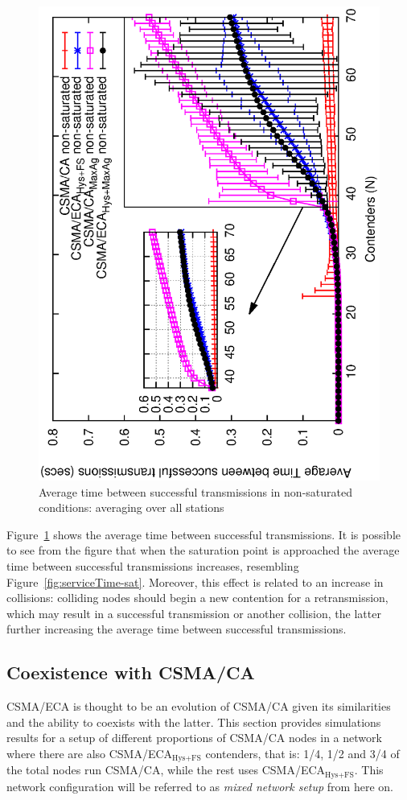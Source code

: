 	\begin{figure}[tb]
		\centering
		\includegraphics[width=0.7\linewidth,angle=-90]{figures/unsaturated/timeBetweenSxTx-unsat/timeBetweenSxTx-multiplot-unsat2.eps}
		\caption{Average time between successful transmissions in non-saturated conditions: averaging over all stations}
		\label{fig:timeBetweenSxTx-multiplot-unsat}
	\end{figure}	
	
	Figure~\ref{fig:timeBetweenSxTx-multiplot-unsat} shows the average time between successful transmissions. It is possible to see from the figure that when the saturation point is approached the average time between successful transmissions increases, resembling Figure~\ref{fig:serviceTime-sat}. Moreover, this effect is related to an increase in collisions: colliding nodes should begin a new contention for a retransmission, which may result in a successful transmission or another collision, the latter further increasing the average time between successful transmissions.
	
	\subsection{Coexistence with CSMA/CA}\label{coexistance-w-csmaca}
	
	CSMA/ECA is thought to be an evolution of CSMA/CA given its similarities and the ability to coexists with the latter. This section provides simulations results for a setup of different proportions of CSMA/CA nodes in a network where there are also CSMA/ECA$_{\text{Hys+FS}}$ contenders, that is: 1/4, 1/2 and 3/4 of the total nodes run CSMA/CA, while the rest uses CSMA/ECA$_{\text{Hys+FS}}$. This network configuration will be referred to as \emph{mixed network setup} from here on.	
